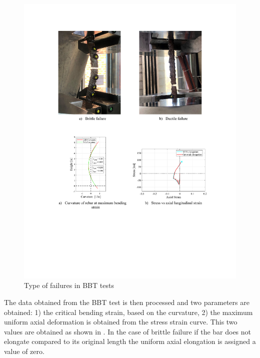 \begin{figure}[htbp]
	\centering
    \includegraphics[width=1\textwidth]{VAC Thesis 2.0/Chapter-4/figs/BBT_Brittle_vs_Ductile_fracture.pdf}
	\caption{Type of failures in BBT tests}
	\label{fig:bbt_brittle_vs_duc}
\end{figure}

The data obtained from the BBT test is then processed and two parameters are obtained: 1) the critical bending strain, based on the curvature, 2) the maximum uniform axial deformation is obtained from the stress strain curve. This two values are obtained as shown in . In the case of brittle failure if the bar does not elongate compared to its original length the uniform axial elongation is assigned a value of zero.

